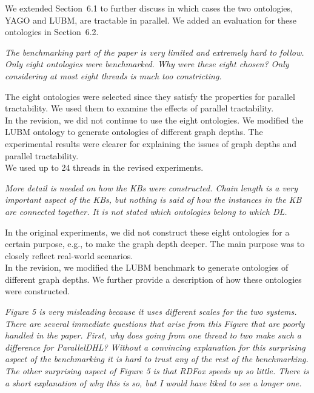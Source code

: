 \documentclass{article}
\let\quoteOld\quote
\let\endquoteOld\endquote
\renewenvironment{quote}{\quoteOld\itshape}{\endquoteOld}
\begin{document}
We extended Section~6.1 to further discuss in which cases
the two ontologies, YAGO and LUBM, are tractable in parallel.
We added an evaluation for these ontologies in Section~6.2.

\begin{quote}
The benchmarking part of the paper is very limited and extremely hard to
follow.    Only eight ontologies were benchmarked.  Why were these eight
chosen?  Only considering at most eight threads is much too constricting.
\end{quote}

The eight ontologies were selected since they satisfy the properties for parallel tractability.
We used them to examine the effects of parallel tractability.\\

In the revision, we did not continue to use the eight ontologies.
We modified the LUBM ontology to generate ontologies of different graph depths.
The experimental results were clearer for explaining the issues of graph depths
and parallel tractability.\\

We used up to 24 threads in the revised experiments.


\begin{quote}
More detail is needed on how the KBs were constructed.  Chain length is a
very important aspect of the KBs, but nothing is said of how the instances
in the KB are connected together.  It is not stated which ontologies belong
to which DL.
\end{quote}

In the original experiments, we did not
construct these eight ontologies for a certain purpose, e.g., to
make the graph depth deeper. The main purpose was to closely reflect real-world scenarios. \\

In the revision, we modified the LUBM benchmark to generate ontologies of
different graph depths. We further provide a description of how these ontologies
were constructed.


\begin{quote}
Figure 5 is very misleading because it uses different scales for the two
systems.   There are several immediate questions that arise from this Figure
that are poorly handled in the paper.  First, why does going from one thread
to two make such a difference for ParallelDHL?  Without a convincing
explanation for this surprising aspect of the benchmarking it is hard to
trust any of the rest of the benchmarking.  The other surprising aspect of
Figure 5 is that RDFox speeds up so little.  There is a short explanation of
why this is so, but I would have liked to see a longer one.
\end{quote}
\end{document}
